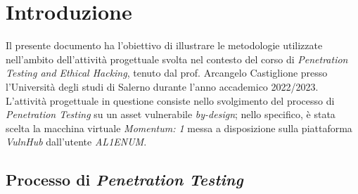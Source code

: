 \chapter{Introduzione}
Il presente documento ha l'obiettivo di illustrare le metodologie utilizzate nell'ambito dell'attività progettuale svolta nel contesto del corso di \emph{Penetration Testing and Ethical Hacking}, tenuto dal prof. Arcangelo Castiglione presso l'Università degli studi di Salerno durante l'anno accademico 2022/2023. L'attività progettuale in questione consiste nello svolgimento del processo di \emph{Penetration Testing} su un asset vulnerabile \emph{by-design}; nello specifico, è stata scelta la macchina virtuale \emph{Momentum: 1} messa a disposizione sulla piattaforma \emph{VulnHub} dall'utente \emph{AL1ENUM}. 

\section{Processo di \emph{Penetration Testing}}
